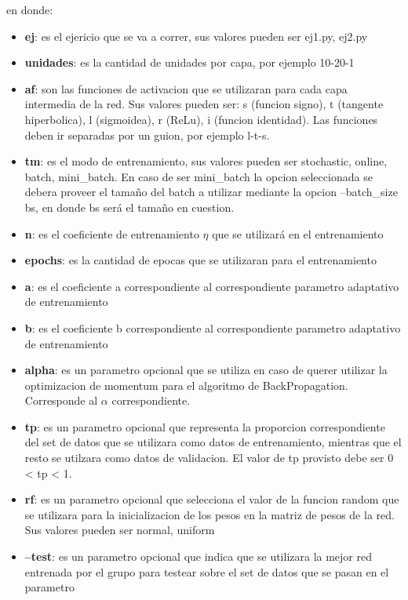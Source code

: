 en donde:
\begin{itemize}
  \item \textbf{ej}: es el ejericio que se va a correr, sus valores pueden ser {ej1.py, ej2.py}
  \item \textbf{unidades}: es la cantidad de unidades por capa, por ejemplo 10-20-1
  \item \textbf{af}: son las funciones de activacion que se utilizaran para cada capa intermedia de la red. Sus valores pueden ser: s (funcion signo), t (tangente hiperbolica),
                    l (sigmoidea), r (ReLu), i (funcion identidad). Las funciones deben ir separadas por un guion, por ejemplo l-t-s.
  \item \textbf{tm}: es el modo de entrenamiento, sus valores pueden ser {stochastic, online, batch, mini\_batch}. En caso de ser mini\_batch la opcion seleccionada se debera
            proveer el tamaño del batch a utilizar mediante la opcion --batch\_size bs, en donde bs será el tamaño en cuestion.
  \item \textbf{n}: es el coeficiente de entrenamiento $\eta$ que se utilizará en el entrenamiento
  \item \textbf{epochs}: es la cantidad de epocas que se utilizaran para el entrenamiento
  \item \textbf{a}: es el coeficiente a correspondiente al correspondiente parametro adaptativo de entrenamiento
  \item \textbf{b}: es el coeficiente b correspondiente al correspondiente parametro adaptativo de entrenamiento
  \item \textbf{alpha}: es un parametro opcional que se utiliza en caso de querer utilizar la optimizacion de momentum para el algoritmo de BackPropagation. Corresponde al $\alpha$
                correspondiente.
  \item \textbf{tp}: es un parametro opcional que representa la proporcion correspondiente del set de datos que se utilizara como datos de entrenamiento,
            mientras que el resto se utilzara como datos de validacion. El valor de tp provisto debe ser 0 < tp < 1.
  \item \textbf{rf}: es un parametro opcional que selecciona el valor de la funcion random que se utilizara para la inicializacion de los pesos en la matriz de pesos de la red.
            Sus valores pueden ser {normal, uniform}
  \item \textbf{--test}: es un parametro opcional que indica que se utilizara la mejor red entrenada por el grupo para testear sobre el set de datos que se pasan en el parametro

\end{itemize}
